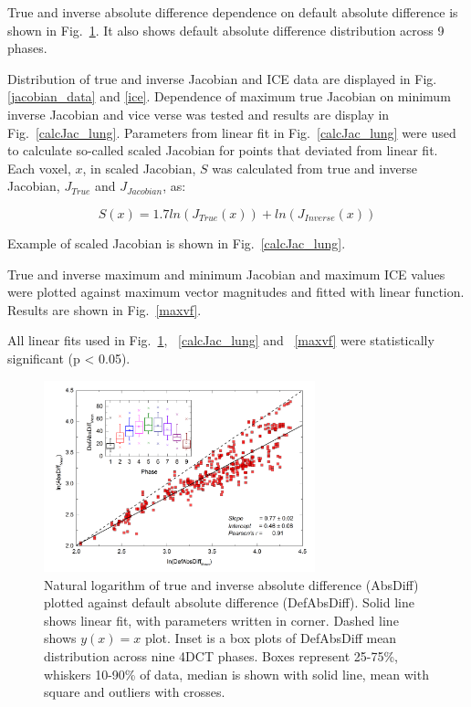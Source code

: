 \documentclass[type=dr, dr=rernat, accentcolor=tud7b,colorbacktitle, bigchapter, openright, twoside, 12pt ]{tudthesis}
\begin{document}
True and inverse absolute difference dependence on default absolute difference is shown in Fig.~\ref{absDiff_lung}. It also shows default absolute difference distribution across 9 phases. 

Distribution of true and inverse Jacobian and ICE data are displayed in Fig. \ref{jacobian_data} and \ref{ice}. Dependence of maximum true Jacobian on minimum inverse Jacobian and vice verse was tested and results are display in Fig.~\ref{calcJac_lung}. Parameters from linear fit in Fig.~\ref{calcJac_lung} were used to calculate so-called scaled Jacobian for points that deviated from linear fit. Each voxel, $x$, in scaled Jacobian, $S$ was calculated from true and inverse Jacobian, $J_{True}$ and $J_{Jacobian}$, as:

\begin{equation}
S(x) = 1.7 ln(J_{True}(x)) + ln(J_{Inverse}(x))
\end{equation}

Example of scaled Jacobian is shown in Fig.~\ref{calcJac_lung}.

True and inverse maximum and minimum Jacobian and maximum ICE values were plotted against maximum vector magnitudes and fitted with linear function. Results are shown in Fig.~\ref{maxvf}.

All linear fits used in Fig.~\ref{absDiff_lung}, ~\ref{calcJac_lung} and ~\ref{maxvf} were statistically significant (p < 0.05).


\newpage


\begin{figure}[H]
	\begin{center}		
		\includegraphics[width=0.7\textwidth]{./Images/absDiff.png}
		\caption{Natural logarithm of true and inverse absolute difference (AbsDiff) plotted against default absolute difference (DefAbsDiff). Solid line shows linear fit, with parameters
		written in corner. Dashed line shows $y(x)=x$ plot. Inset is a box plots of DefAbsDiff mean distribution across nine 4DCT phases. Boxes represent 25-75\%, whiskers 10-90\%
		of data, median is shown with solid line, mean with square and outliers with crosses.}
		\label{absDiff_lung}
	\end{center}
\end{figure}
\end{document}
